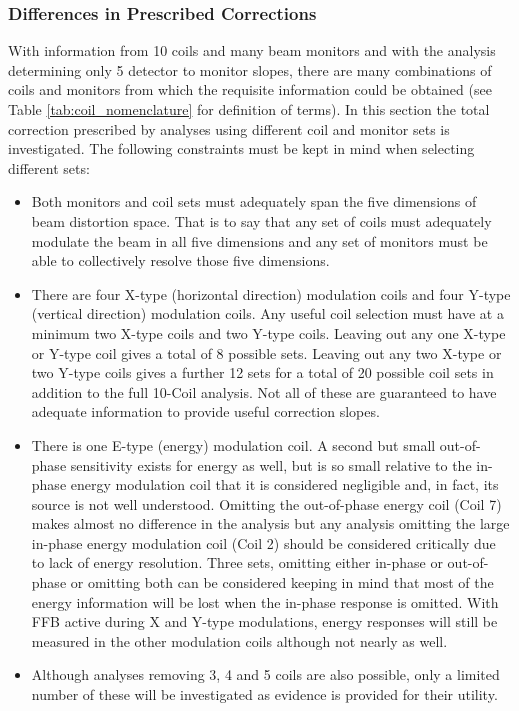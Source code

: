 \subsubsection{Differences in Prescribed Corrections}
With information from 10 coils and many beam monitors and with the analysis determining only 5 detector to monitor slopes, there are many combinations of coils and monitors from which the requisite information could be obtained (see Table \ref{tab:coil_nomenclature} for definition of terms). In this section the total correction prescribed by analyses using different coil and monitor sets is investigated. The following constraints must be kept in mind when selecting different sets:
\begin{itemize}
\item{Both monitors and coil sets must adequately span the five dimensions of beam distortion space. That is to say that any set of coils must adequately modulate the beam in all five dimensions and any set of monitors must be able to collectively resolve those five dimensions. }
\item{There are four X-type (horizontal direction) modulation coils and four Y-type (vertical direction) modulation coils. Any useful coil selection must have at a minimum two X-type coils and two Y-type coils. Leaving out any one X-type or Y-type coil gives a total of 8 possible sets. Leaving out any two X-type or two Y-type coils gives a further 12 sets for a total of 20 possible coil sets in addition to the full 10-Coil analysis. Not all of these are guaranteed to have adequate information to provide useful correction slopes.}
\item{There is one E-type (energy) modulation coil. A second but small out-of-phase sensitivity exists for energy as well, but is so small relative to the in-phase energy modulation coil that it is considered negligible and, in fact, its source is not well understood. Omitting the out-of-phase energy coil (Coil 7) makes almost no difference in the analysis but any analysis omitting the large in-phase energy modulation coil (Coil 2) should be considered critically due to lack of energy resolution. Three sets, omitting either in-phase or out-of-phase or omitting both can be considered keeping in mind that most of the energy information will be lost when the in-phase response is omitted. With FFB active during X and Y-type modulations, energy responses will still be measured in the other modulation coils although not nearly as well.}
\item{Although analyses removing 3, 4 and 5 coils are also possible, only a limited number of these will be investigated as evidence is provided for their utility.}

\end{itemize}
